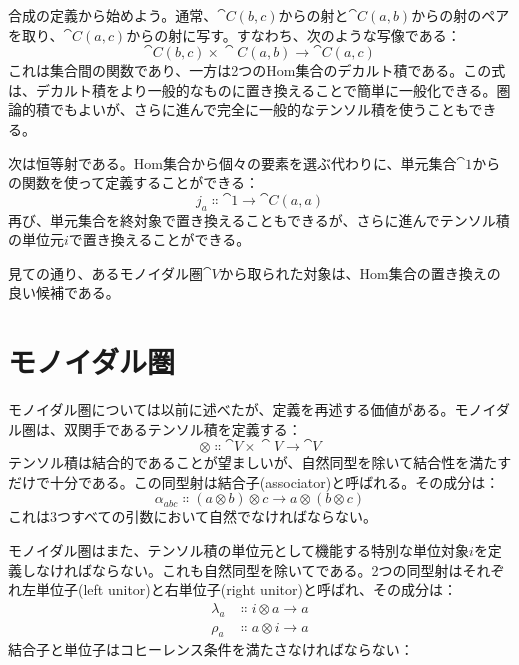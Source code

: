 合成の定義から始めよう。通常、$\cat{C}(b, c)$からの射と$\cat{C}(a, b)$からの射のペアを取り、$\cat{C}(a, c)$からの射に写す。すなわち、次のような写像である：
\[\cat{C}(b, c)\times{}\cat{C}(a, b) \to \cat{C}(a, c)\]
これは集合間の関数であり、一方は2つのHom集合のデカルト積である。この式は、デカルト積をより一般的なものに置き換えることで簡単に一般化できる。圏論的積でもよいが、さらに進んで完全に一般的なテンソル積を使うこともできる。

次は恒等射である。Hom集合から個々の要素を選ぶ代わりに、単元集合$\cat{1}$からの関数を使って定義することができる：
\[j_a \Colon \cat{1} \to \cat{C}(a, a)\]
再び、単元集合を終対象で置き換えることもできるが、さらに進んでテンソル積の単位元$i$で置き換えることができる。

見ての通り、あるモノイダル圏$\cat{V}$から取られた対象は、Hom集合の置き換えの良い候補である。

\section{モノイダル圏}

モノイダル圏については以前に述べたが、定義を再述する価値がある。モノイダル圏は、双関手であるテンソル積を定義する：
\[\otimes \Colon \cat{V}\times{}\cat{V} \to \cat{V}\]
テンソル積は結合的であることが望ましいが、自然同型を除いて結合性を満たすだけで十分である。この同型射は結合子(associator)と呼ばれる。その成分は：
\[\alpha_{a b c} \Colon (a \otimes b) \otimes c \to a \otimes (b \otimes c)\]
これは3つすべての引数において自然でなければならない。

モノイダル圏はまた、テンソル積の単位元として機能する特別な単位対象$i$を定義しなければならない。これも自然同型を除いてである。2つの同型射はそれぞれ左単位子(left unitor)と右単位子(right unitor)と呼ばれ、その成分は：
\begin{align*}
  \lambda_a & \Colon i \otimes a \to a \\
  \rho_a    & \Colon a \otimes i \to a
\end{align*}
結合子と単位子はコヒーレンス条件を満たさなければならない：

\begin{figure}[H]
  \centering
\end{figure}

